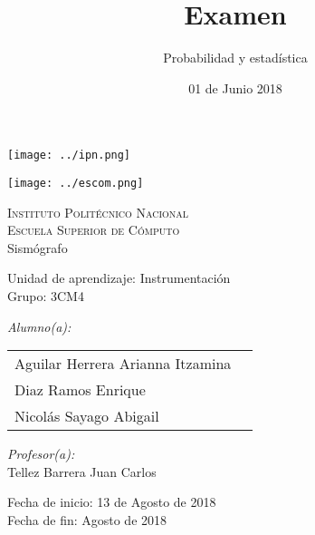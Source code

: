 \documentclass[12pt]{article}
\date{ 01 de Junio 2018}
\title{Examen}
\author{Probabilidad y estadística}
\begin{document}
		\begin{titlepage}
			\begin{center}
				
				
				\noindent
				\begin{minipage}{0.5\textwidth}
					\begin{flushleft} \large
						\texttt{[image: ../ipn.png]}
					\end{flushleft}
				\end{minipage}%
				\begin{minipage}{0.55\textwidth}
					\begin{flushright} \large
						\texttt{[image: ../escom.png]}
					\end{flushright}
				\end{minipage}
				
				\textsc{\LARGE Instituto Politécnico Nacional}\\[0.5cm]
				
				\textsc{\Large Escuela Superior de Cómputo}\\[1cm]
				
				
				{ \huge Sismógrafo \\[1cm] }
				
				{ \Large Unidad de aprendizaje: Instrumentación} \\[1cm]
				
				{ \Large Grupo: 3CM4 } \\[1cm]
				
				\noindent
				\begin{minipage}{0.5\textwidth}
					\begin{flushleft} \large
						\emph{Alumno(a):}\\
						
						\begin{tabular}{ll}
						Aguilar Herrera Arianna Itzamina \\
					    Diaz Ramos Enrique \\
					    Nicolás Sayago Abigail\\
					\end{tabular}
					\end{flushleft}
				\end{minipage}%
				\begin{minipage}{0.5\textwidth}
					\begin{flushright} \large
						\emph{Profesor(a):} \\
						Tellez Barrera Juan Carlos  \\
					\end{flushright}
				\end{minipage}
				
				\vfill
				
				{\large Fecha de inicio: 13 de Agosto de 2018} \\
				{\large Fecha de fin: Agosto de 2018}
			\end{center}
		\end{titlepage}
	
\end{document}

